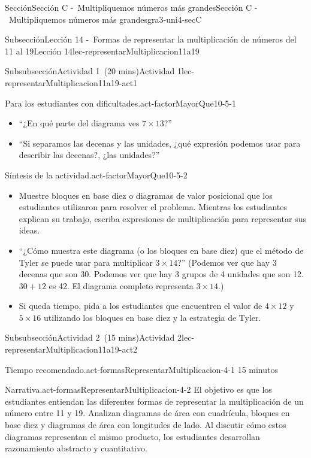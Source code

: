 \documentclass[oneside,10pt,]{article}
\begin{document}
\begin{sectionptx}{Sección}{Sección C -~Multipliquemos números más grandes}{}{Sección C -~Multipliquemos números más grandes}{}{}{gra3-uni4-secC}
\begin{subsectionptx}{Subsección}{Lección 14 -~Formas de representar la multiplicación de números del 11 al 19}{}{Lección 14}{}{}{lec-representarMultiplicacion11a19}
\begin{subsubsectionptx}{Subsubsección}{Actividad 1~(20 mins)}{}{Actividad 1}{}{}{lec-representarMultiplicacion11a19-act1}
\begin{paragraphs}{Para los estudiantes con dificultades.}{act-factorMayorQue10-5-1}
\begin{itemize}[label=\textbullet]
\item{}``¿En qué parte del diagrama ves \(7\times 13\)?''%
\item{}``Si separamos las decenas y las unidades, ¿qué expresión podemos usar para describir las decenas?, ¿las unidades?''%
\end{itemize}
\end{paragraphs}%
\begin{paragraphs}{Síntesis de la actividad.}{act-factorMayorQue10-5-2}%
%
\begin{itemize}[label=\textbullet]
\item{}Muestre bloques en base diez o diagramas de valor posicional que los estudiantes utilizaron para resolver el problema. Mientras los estudiantes explican su trabajo, escriba expresiones de multiplicación para representar sus ideas.%
\item{}``¿Cómo muestra este diagrama (o los bloques en base diez) que el método de Tyler se puede usar para multiplicar \(3 \times 14\)?'' (Podemos ver que hay 3 decenas que son 30. Podemos ver que hay 3 grupos de 4 unidades que son 12. \(30 + 12\) es 42. El diagrama completo representa \(3 \times 14\).)%
\item{}Si queda tiempo, pida a los estudiantes que encuentren el valor de \(4 \times 12\) y \(5 \times 16\) utilizando los bloques en base diez y la estrategia de Tyler.%
\end{itemize}
\end{paragraphs}%
\end{subsubsectionptx}
%
%
\typeout{************************************************}
\typeout{************************************************}
%
\begin{subsubsectionptx}{Subsubsección}{Actividad 2~(15 mins)}{}{Actividad 2}{}{}{lec-representarMultiplicacion11a19-act2}
\par
\begin{paragraphs}{Tiempo recomendado.}{act-formasRepresentarMultiplicacion-4-1}%
15 minutos%
\end{paragraphs}%
\begin{paragraphs}{Narrativa.}{act-formasRepresentarMultiplicacion-4-2}%
El objetivo es que los estudiantes entiendan las diferentes formas de representar la multiplicación de un número entre 11 y 19. Analizan diagramas de área con cuadrícula, bloques en base diez y diagramas de área con longitudes de lado. Al discutir cómo estos diagramas representan el mismo producto, los estudiantes desarrollan razonamiento abstracto y cuantitativo.%

\end{paragraphs}
\end{subsubsectionptx}
\end{subsectionptx}
\end{sectionptx}
\end{document}
